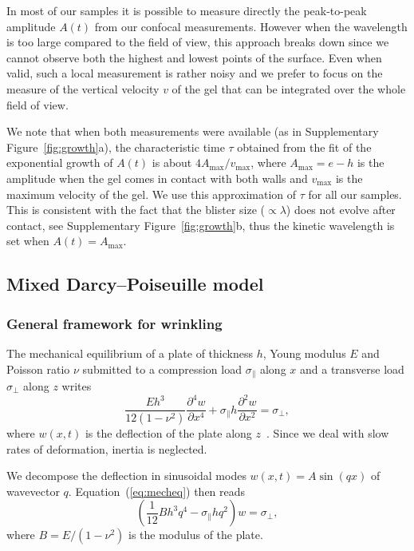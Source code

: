 \documentclass[twocolumn,superscriptaddress,showpacs,preprintnumbers,
amsmath,amssymb,prl]{revtex4-1}
\begin{document}
In most of our samples it is possible to measure directly the peak-to-peak amplitude $A(t)$ from our confocal measurements. However when the wavelength is too large compared to the field of view, this approach breaks down since we cannot observe both the highest and lowest points of the surface. Even when valid, such a local measurement is rather noisy and we prefer to focus on the measure of the vertical velocity $v$ of the gel that can be integrated over the whole field of view.

We note that when both measurements were available (as in Supplementary Figure~\ref{fig:growth}a), the characteristic time $\tau$ obtained from the fit of the exponential growth of $A(t)$ is about $4A_\text{max}/v_\text{max}$, where $A_\text{max} = e-h$ is the amplitude when the gel comes in contact with both walls and $v_\text{max}$ is the maximum velocity of the gel. We use this approximation of $\tau$ for all our samples. This is consistent with the fact that the blister size ($\propto\lambda$) does not evolve after contact, see Supplementary Figure~\ref{fig:growth}b, thus the kinetic wavelength is set when $A(t) = A_\text{max}$.



\subsection*{Mixed Darcy--Poiseuille model}

\subsubsection*{General framework for wrinkling}

The mechanical equilibrium of a plate of thickness $h$, Young modulus $E$ and Poisson ratio $\nu$ submitted to a compression load $\sigma_\parallel$ along $x$ and a transverse load $\sigma_\perp$ along $z$ writes
\begin{equation}
\frac{E h^3}{12(1-\nu^2)}\frac{\partial^4 w}{\partial x^4} + \sigma_\parallel h \frac{\partial^2 w}{\partial x^2} = \sigma_\perp,
\label{eq:mecheq}
\end{equation}
where $w(x,t)$ is the deflection of the plate along $z$~\cite{Biot1957}. Since we deal with slow rates of deformation, inertia is neglected.

We decompose the deflection in sinusoidal modes $w(x,t) =  A \sin (qx)$ of wavevector $q$. Equation~(\ref{eq:mecheq}) then reads
\begin{equation}
\left(\frac{1}{12} B h^3 q^4 - \sigma_\parallel h q^2\right)w = \sigma_\perp,
\label{eq:mecheqop}
\end{equation}
where $B=E/(1-\nu^2)$ is the modulus of the plate.
\end{document}
